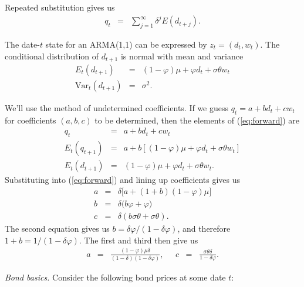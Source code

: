 \documentclass[11pt]{exam}
\begin{document}
\begin{questions}
\begin{solution}
\begin{parts}
\item Repeated substitution gives us
\begin{eqnarray*}
    q_t &=& \sum_{j=1}^\infty \delta^j E(d_{t+j}) .
\end{eqnarray*}
\item The date-$t$ state for an ARMA(1,1) can be expressed by $z_t = (d_t, w_t)$.
The conditional distribution of $d_{t+1}$ is normal with mean and variance
\begin{eqnarray*}
    E_t (d_{t+1}) &=& (1-\varphi) \mu + \varphi d_t + \sigma \theta w_t \\
    \mbox{Var}_t (d_{t+1}) &=& \sigma^2 .
\end{eqnarray*}
\item We'll use the method of undetermined coefficients.
If we guess $q_t = a + b d_t + c w_t $ for coefficients $(a,b,c)$ to be determined,
then the elements of (\ref{eq:forward}) are
\begin{eqnarray*}
    q_t &=& a + b d_t + c w_t \\
    E_t (q_{t+1}) &=& a + b [(1-\varphi) \mu + \varphi d_t + \sigma \theta w_t ] \\
    E_t (d_{t+1}) &=& (1-\varphi) \mu + \varphi d_t + \sigma \theta w_t .
\end{eqnarray*}
Substituting into (\ref{eq:forward}) and lining up coefficients gives us
\begin{eqnarray*}
    a &=& \delta \big[ a + (1+b)(1-\varphi) \mu \big] \\
    b &=& \delta \big( b \varphi + \varphi \big) \\
    c &=& \delta (b \sigma \theta + \sigma \theta) .
\end{eqnarray*}
The second equation gives us $b= \delta\varphi / (1-\delta\varphi) $, 
and therefore $1+b = 1/(1-\delta\varphi)$.
The first and third then give us
\begin{eqnarray*}
    a &=& \frac{(1-\varphi)\mu\delta}{(1-\delta)(1-\delta\varphi)} ,
    \;\;\;\;\; c \;\;=\;\; \frac{\sigma\theta\delta}{1-\delta\varphi} .
\end{eqnarray*}

\end{parts}
\end{solution}


\item {\it Bond basics.\/}
Consider the following bond prices at some date $t$:


\end{questions}
\end{document}
